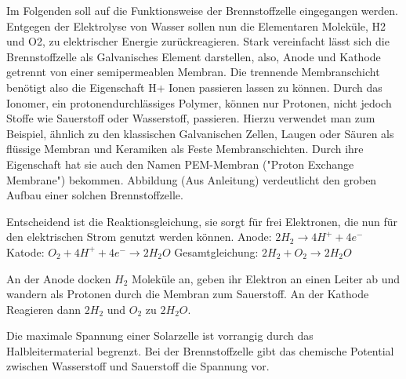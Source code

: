 Im Folgenden soll auf die Funktionsweise der Brennstoffzelle eingegangen werden. 
Entgegen der Elektrolyse von Wasser sollen nun die Elementaren Moleküle, H2 und O2, zu elektrischer Energie zurückreagieren.
Stark vereinfacht lässt sich die Brennstoffzelle als Galvanisches Element darstellen, also, Anode und Kathode getrennt von einer semipermeablen Membran.
Die trennende Membranschicht benötigt also die Eigenschaft H+ Ionen passieren lassen zu können.
Durch das Ionomer, ein protonendurchlässiges Polymer, können nur Protonen, nicht jedoch Stoffe wie Sauerstoff oder Wasserstoff, passieren.
Hierzu verwendet man zum Beispiel, ähnlich zu den klassischen Galvanischen Zellen, Laugen oder Säuren als flüssige Membran und Keramiken als Feste Membranschichten.
Durch ihre Eigenschaft hat sie auch den Namen PEM-Membran ("Proton Exchange Membrane") bekommen.
Abbildung (Aus Anleitung) verdeutlicht den groben Aufbau einer solchen Brennstoffzelle.

Entscheidend ist die Reaktionsgleichung, sie sorgt für frei Elektronen, die nun für den elektrischen Strom genutzt werden können.
Anode:
$2 H_2 \rightarrow 4 H^+ + 4e^-$
Katode:
$O_2 + 4 H^+ + 4 e^- \rightarrow 2 H_2O$
Gesamtgleichung:
$2 H_2 + O_2 \rightarrow 2 H_2O$

An der Anode docken $H_2$ Moleküle an, geben ihr Elektron an einen Leiter ab und wandern als Protonen durch die Membran zum Sauerstoff.
An der Kathode Reagieren dann $2 H_2$ und $O_2$ zu $2 H_2O$.


Die maximale Spannung einer Solarzelle ist vorrangig durch das Halbleitermaterial begrenzt. Bei der Brennstoffzelle gibt das chemische Potential zwischen Wasserstoff und Sauerstoff die Spannung vor.
